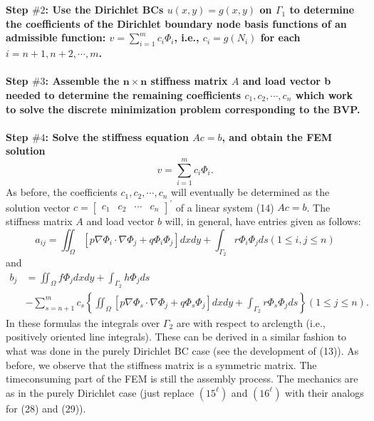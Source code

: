\documentclass[../main.tex]{subfiles}
\begin{document}
\\
\\
\textbf{Step $\#2$: Use the Dirichlet BCs $u(x, y)=g(x, y)$ on $\Gamma_{1}$ to determine the coefficients of the Dirichlet boundary node basis functions of an admissible function: $v=\sum_{i=1}^{m} c_{i} \Phi_{i}$, i.e., $c_{i}=g\left(N_{i}\right)$ for each $i=n+1, n+2, \cdots, m$.}
\\
\\
\textbf{Step $\#3$: Assemble the $\boldsymbol{n} \times \boldsymbol{n}$ stiffness matrix $A$ and load vector b needed to determine the remaining coefficients $c_{1}, c_{2}, \cdots, c_{n}$ which work to solve the discrete minimization problem corresponding to the BVP.
\\
\\
Step $\#4$: Solve the stiffness equation $A c=b$, and obtain the FEM solution}
$$
v=\sum_{i=1}^{m} c_{i} \Phi_{i} .
$$
As before, the coefficients $c_{1}, c_{2}, \cdots, c_{n}$ will eventually be determined as the solution vector $c=\left[\begin{array}{llll}c_{1} & c_{2} & \cdots & c_{n}\end{array}\right]^{\prime}$ of a linear system (14) $A c=b$. The stiffness matrix $A$ and load vector $b$ will, in general, have entries given as follows:
\begin{equation}
a_{i j}=\iint_{\Omega}\left[p \nabla \Phi_{i} \cdot \nabla \Phi_{j}+q \Phi_{i} \Phi_{j}\right] d x d y+\int_{\Gamma_{2}} r \Phi_{i} \Phi_{j} d s(1 \leq i, j \leq n)
\end{equation}
and
\begin{equation}
\begin{aligned}
b_{j} &=\iint_{\Omega} f \Phi_{j} d x d y+\int_{\Gamma_{2}} h \Phi_{j} d s \\
&-\sum_{s=n+1}^{m} c_{s}\left\{\iint_{\Omega}\left[p \nabla \Phi_{s} \cdot \nabla \Phi_{j}+q \Phi_{s} \Phi_{j}\right] d x d y+\int_{\Gamma_{2}} r \Phi_{s} \Phi_{j} d s\right\}(1 \leq j \leq n) .
\end{aligned}
\end{equation}
In these formulas the integrals over $\Gamma_{2}$ are with respect to arclength (i.e., positively oriented line integrals). These can be derived in a similar fashion to what was done in the purely Dirichlet $\mathrm{BC}$ case (see the development of (13)). As before, we observe that the stiffness matrix is a symmetric matrix. The timeconsuming part of the FEM is still the assembly process. The mechanics are as in the purely Dirichlet case (just replace $\left(15^{\ell}\right)$ and $\left(16^{\ell}\right)$ with their analogs for (28) and (29)).
\end{document}
